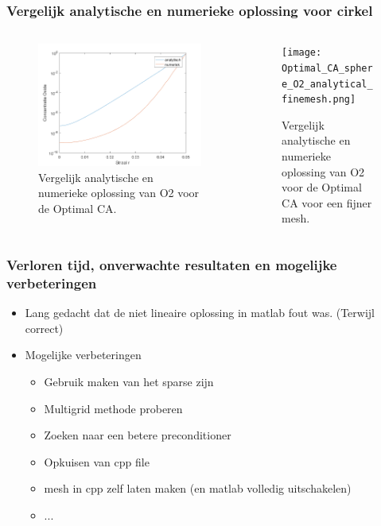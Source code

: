 \documentclass{beamer}
\begin{document}
\begin{frame}
\frametitle{Vergelijk analytische en numerieke oplossing voor cirkel}
\begin{columns}
\begin{column}{0.48\textwidth}
\begin{figure}
\includegraphics[width = 1\textwidth]{Optimal_CA_sphere_O2_analytical.png}
\caption{Vergelijk analytische en numerieke oplossing van O2 voor de Optimal CA.}
\end{figure}
\end{column}


\begin{column}{0.48\textwidth}
\begin{figure}
\texttt{[image: Optimal\_CA\_sphere\_O2\_analytical\_finemesh.png]}
\caption{Vergelijk analytische en numerieke oplossing van O2 voor de Optimal CA voor een fijner mesh.}
\end{figure}
\end{column}
\end{columns}
\end{frame}



\begin{frame}
\frametitle{Verloren tijd, onverwachte resultaten en mogelijke verbeteringen}
\begin{itemize}
\item Lang gedacht dat de niet lineaire oplossing in matlab fout was. (Terwijl correct)
\item Mogelijke verbeteringen
\begin{itemize}
\item Gebruik maken van het sparse zijn
\item Multigrid methode proberen
\item Zoeken naar een betere preconditioner
\item Opkuisen van cpp file
\item mesh in cpp zelf laten maken (en matlab volledig uitschakelen)
\item ...
\end{itemize}
\end{itemize}
\end{frame}
\end{document}
